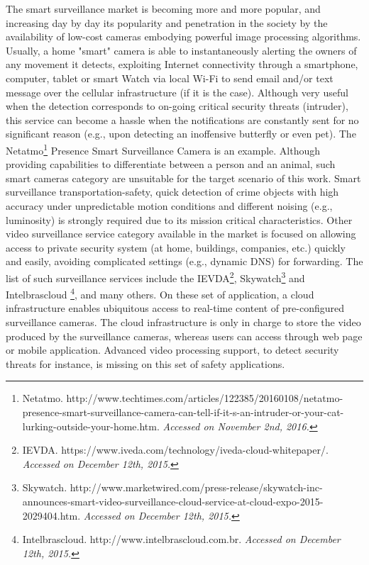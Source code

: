 The smart surveillance market is becoming more and more popular, and increasing day by day its popularity and penetration in the society by the availability of low-cost cameras embodying powerful image processing algorithms. 
Usually, a home "smart" camera is able to instantaneously alerting the owners of any movement it detects,  exploiting Internet connectivity through a smartphone, computer, tablet or smart Watch via local Wi-Fi to send email and/or text message over the cellular infrastructure (if it is the case). Although very useful when the detection corresponds to on-going critical security threats (intruder), this service can become a hassle when the notifications are constantly sent for no significant reason (e.g., upon detecting an inoffensive
 butterfly or even pet). The Netatmo\footnote[10]{Netatmo. http://www.techtimes.com/articles/122385/20160108/netatmo-presence-smart-surveillance-camera-can-tell-if-it-s-an-intruder-or-your-cat-lurking-outside-your-home.htm. \textit{Accessed on November 2nd, 2016.}} Presence Smart Surveillance Camera is an example. Although providing capabilities to differentiate between a person and an animal, such smart cameras category are unsuitable for the target scenario of this work. Smart surveillance transportation-safety, quick detection of crime objects with high accuracy under unpredictable motion conditions and different noising (e.g., luminosity) is strongly required due to its mission critical characteristics. Other video surveillance service category available in the market is focused on allowing access to private security system (at home, buildings, companies, etc.) quickly and easily, avoiding complicated settings (e.g., dynamic DNS) for forwarding. 
The list of such surveillance services include the IEVDA\footnote[11]{IEVDA. https://www.iveda.com/technology/iveda-cloud-whitepaper/. \textit{Accessed on December 12th, 2015.}}, Skywatch\footnote[12]{Skywatch. http://www.marketwired.com/press-release/skywatch-inc-announces-smart-video-surveillance-cloud-service-at-cloud-expo-2015-2029404.htm. \textit{Accessed on December 12th, 2015.}} and Intelbrascloud \footnote[13]{Intelbrascloud. http://www.intelbrascloud.com.br. \textit{Accessed on December 12th, 2015.}}, and many others. On these set of application, a cloud infrastructure enables ubiquitous access to real-time content of pre-configured surveillance cameras. The cloud infrastructure is only in charge to store the video produced by the surveillance cameras, whereas users can access through web page or mobile application. Advanced video processing support, to detect security threats for instance, is missing on this set of safety applications. 

